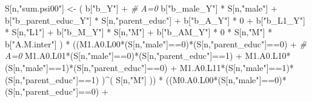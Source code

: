 \documentclass[
]{book}
\newenvironment{Shaded}{\begin{snugshade}}{\end{snugshade}}
\newcommand{\CommentTok}[1]{\textcolor[rgb]{0.56,0.35,0.01}{\textit{#1}}}
\newcommand{\DecValTok}[1]{\textcolor[rgb]{0.00,0.00,0.81}{#1}}
\newcommand{\NormalTok}[1]{#1}
\newcommand{\OtherTok}[1]{\textcolor[rgb]{0.56,0.35,0.01}{#1}}
\newcommand{\SpecialCharTok}[1]{\textcolor[rgb]{0.00,0.00,0.00}{#1}}
\newcommand{\StringTok}[1]{\textcolor[rgb]{0.31,0.60,0.02}{#1}}
\begin{document}
\begin{Shaded}
\begin{Highlighting}[]
\NormalTok{    S[n,}\StringTok{"sum.psi00"}\NormalTok{] }\OtherTok{\textless{}{-}}\NormalTok{  ( b[}\StringTok{"b\_Y"}\NormalTok{] }\SpecialCharTok{+}                                           \CommentTok{\# A=0}
\NormalTok{                             b[}\StringTok{"b\_male\_Y"}\NormalTok{] }\SpecialCharTok{*}\NormalTok{ S[n,}\StringTok{"male"}\NormalTok{] }\SpecialCharTok{+} 
\NormalTok{                             b[}\StringTok{"b\_parent\_educ\_Y"}\NormalTok{] }\SpecialCharTok{*}\NormalTok{ S[n,}\StringTok{"parent\_educ"}\NormalTok{] }\SpecialCharTok{+} 
\NormalTok{                             b[}\StringTok{"b\_A\_Y"}\NormalTok{] }\SpecialCharTok{*} \DecValTok{0} \SpecialCharTok{+} 
\NormalTok{                             b[}\StringTok{"b\_L1\_Y"}\NormalTok{] }\SpecialCharTok{*}\NormalTok{ S[n,}\StringTok{"L1"}\NormalTok{] }\SpecialCharTok{+}
\NormalTok{                             b[}\StringTok{"b\_M\_Y"}\NormalTok{] }\SpecialCharTok{*}\NormalTok{ S[n,}\StringTok{"M"}\NormalTok{] }\SpecialCharTok{+}
\NormalTok{                             b[}\StringTok{"b\_AM\_Y"}\NormalTok{] }\SpecialCharTok{*} \DecValTok{0} \SpecialCharTok{*}\NormalTok{ S[n,}\StringTok{"M"}\NormalTok{] }\SpecialCharTok{*}\NormalTok{ b[}\StringTok{"A.M.inter"}\NormalTok{] ) }\SpecialCharTok{*}
\NormalTok{      ((M1.A0.L00}\SpecialCharTok{*}\NormalTok{(S[n,}\StringTok{"male"}\NormalTok{]}\SpecialCharTok{==}\DecValTok{0}\NormalTok{)}\SpecialCharTok{*}\NormalTok{(S[n,}\StringTok{"parent\_educ"}\NormalTok{]}\SpecialCharTok{==}\DecValTok{0}\NormalTok{) }\SpecialCharTok{+}                    \CommentTok{\# A\textquotesingle{}=0}
\NormalTok{          M1.A0.L01}\SpecialCharTok{*}\NormalTok{(S[n,}\StringTok{"male"}\NormalTok{]}\SpecialCharTok{==}\DecValTok{0}\NormalTok{)}\SpecialCharTok{*}\NormalTok{(S[n,}\StringTok{"parent\_educ"}\NormalTok{]}\SpecialCharTok{==}\DecValTok{1}\NormalTok{) }\SpecialCharTok{+}
\NormalTok{          M1.A0.L10}\SpecialCharTok{*}\NormalTok{(S[n,}\StringTok{"male"}\NormalTok{]}\SpecialCharTok{==}\DecValTok{1}\NormalTok{)}\SpecialCharTok{*}\NormalTok{(S[n,}\StringTok{"parent\_educ"}\NormalTok{]}\SpecialCharTok{==}\DecValTok{0}\NormalTok{) }\SpecialCharTok{+} 
\NormalTok{          M1.A0.L11}\SpecialCharTok{*}\NormalTok{(S[n,}\StringTok{"male"}\NormalTok{]}\SpecialCharTok{==}\DecValTok{1}\NormalTok{)}\SpecialCharTok{*}\NormalTok{(S[n,}\StringTok{"parent\_educ"}\NormalTok{]}\SpecialCharTok{==}\DecValTok{1}\NormalTok{) )}\SpecialCharTok{\^{}}\NormalTok{( S[n,}\StringTok{"M"}\NormalTok{] )) }\SpecialCharTok{*}
\NormalTok{      ((M0.A0.L00}\SpecialCharTok{*}\NormalTok{(S[n,}\StringTok{"male"}\NormalTok{]}\SpecialCharTok{==}\DecValTok{0}\NormalTok{)}\SpecialCharTok{*}\NormalTok{(S[n,}\StringTok{"parent\_educ"}\NormalTok{]}\SpecialCharTok{==}\DecValTok{0}\NormalTok{) }\SpecialCharTok{+}                

\end{Highlighting}
\end{Shaded}
\end{document}
